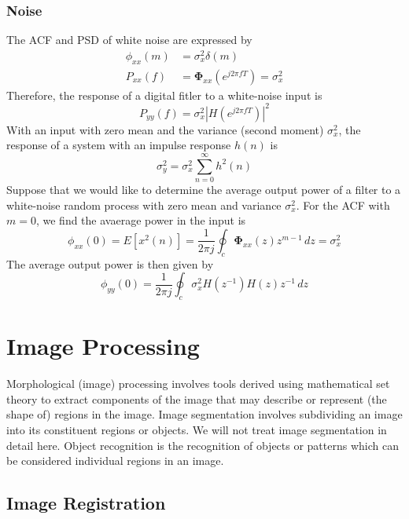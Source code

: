 \documentclass[11pt]{book}
\theoremstyle{example}
\begin{document}
\subsection{Noise}

The ACF and PSD of white noise are expressed by
\begin{align}
	\phi_{xx}(m)&=\sigma_x^2\delta(m)\\
	P_{xx}(f)&=\mathbf{\Phi}_{xx}(e^{j2{\pi}fT})=\sigma_x^2
\end{align}
Therefore, the response of a digital fitler to a white-noise input is
\begin{equation}
	P_{yy}(f)=\sigma_x^2|H(e^{j2{\pi}fT})|^2
\end{equation}
With an input with zero mean and the variance (second moment) $\sigma_x^2$, the response of a system with an impulse response $h(n)$ is
\begin{equation}
	\sigma_y^2=\sigma_x^2\sum_{n=0}^{\infty}{h^2(n)}
\end{equation}
Suppose that we would like to determine the average output power of a filter to a white-noise random process with zero mean and variance $\sigma_x^2$. For the ACF with $m=0$, we find the avaerage power in the input is
\begin{equation}
	\phi_{xx}(0)=E[x^2(n)]=\frac{1}{2{\pi}j}\oint_c{\mathbf{\Phi}_{xx}(z)z^{m-1}\,dz}=\sigma_x^2
\end{equation}
The average output power is then given by
\begin{equation}
	\phi_{yy}(0)=\frac{1}{2{\pi}j}\oint_c{\sigma_x^2H(z^{-1})H(z)z^{-1}\,dz}
\end{equation}

\chapter{Image Processing}

Morphological (image) processing involves tools derived using mathematical set theory to extract components of the image that may describe or represent (the shape of) regions in the image. Image segmentation involves subdividing an image into its constituent regions or objects. We will not treat image segmentation in detail here. Object recognition is the recognition of objects or patterns which can be considered individual regions in an image.

\section{Image Registration}
\end{document}
